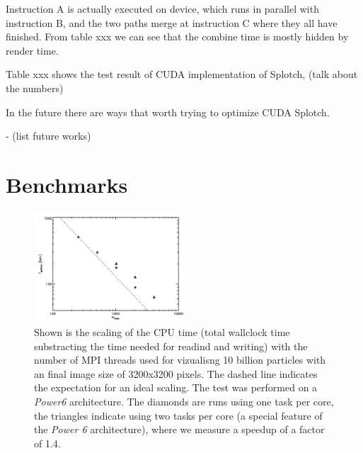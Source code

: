Instruction A is actually executed on device, which runs in parallel with instruction B, and the two paths merge at instruction C where they all have finished. From table xxx we can see that the combine time is mostly hidden by render time. 

Table xxx shows the test result of CUDA implementation of Splotch, (talk about the numbers)

In the future there are ways that worth trying to optimize CUDA Splotch. 

- (list future works)


\section{Benchmarks}
\label{bench}

\begin{figure}
\begin{center}
\includegraphics[width=0.5\textwidth]{t_cpu.pdf}
\end{center}
\caption{Shown is the scaling of the CPU time (total wallclock time substracting the time needed for 
readind and writing) with the number of MPI threads used for vizualisng 10 billion particles with an final
image size of 3200x3200 pixels. The dashed line indicates the expectation for an ideal scaling. The test was 
performed on a {\it Power6} architecture. The diamonds are runs using one task per core, the triangles indicate
using two tasks per core (a special feature of the {\it Power 6} architecture), where we measure a speedup of 
a factor of 1.4.}\label{cpu_scaling}
\end{figure}

